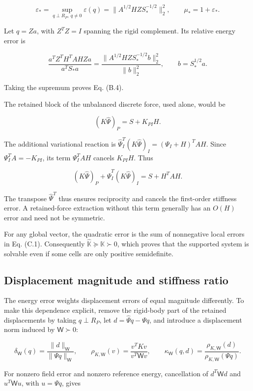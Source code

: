 \documentclass[preprint,12pt,authoryear]{elsarticle}
\begin{document}
\[
\varepsilon_*=\sup_{q\perp R_P,\ q\ne0}\varepsilon(q)
=\|A^{1/2}HZ S_*^{-1/2}\|_2^2,
\qquad\mu_*=1+\varepsilon_*.
\tag{B.4}
\]

Let \(q=Za\), with \(Z^TZ=I\) spanning the rigid complement. Its relative energy error is

\[
\frac{a^TZ^TH^TAHZa}{a^TS_*a}
=\frac{\|A^{1/2}HZ S_*^{-1/2}b\|_2^2}{\|b\|_2^2},
\qquad b=S_*^{1/2}a.
\tag{B.5}
\]

Taking the supremum proves Eq. (B.4).

The retained block of the unbalanced discrete force, used alone, would be

\[
(K\widehat\Psi)_P=S+K_{PI}H.
\]

The additional variational reaction is \(\widehat\Psi_I^T(K\widehat\Psi)_I=(\Psi_I+H)^TAH\). Since \(\Psi_I^TA=-K_{PI}\), its term \(\Psi_I^TAH\) cancels \(K_{PI}H\). Thus

\[
(K\widehat\Psi)_P+\widehat\Psi_I^T(K\widehat\Psi)_I=S+H^TAH.
\tag{B.6}
\]

The transpose \(\widehat\Psi^T\) thus ensures reciprocity and cancels the first-order stiffness error. A retained-force extraction without this term generally has an \(O(H)\) error and need not be symmetric.

For any global vector, the quadratic error is the sum of nonnegative local errors in Eq. (C.1). Consequently \(\widehat{\mathbb K}\succeq\mathbb K\succ0\), which proves that the supported system is solvable even if some cells are only positive semidefinite.

\subsection{Displacement magnitude and stiffness ratio}

The energy error weights displacement errors of equal magnitude differently. To make this dependence explicit, remove the rigid-body part of the retained displacements by taking \(q\perp R_P\), let \(d=\widehat\Psi q-\Psi q\), and introduce a displacement norm induced by \(\mathsf W\succ0\):

\[
\delta_{\mathsf W}(q)=\frac{\|d\|_{\mathsf W}}{\|\Psi q\|_{\mathsf W}},\qquad
\rho_{K,\mathsf W}(v)=\frac{v^TKv}{v^T\mathsf Wv},\qquad
\kappa_{\mathsf W}(q,d)=\frac{\rho_{K,\mathsf W}(d)}{\rho_{K,\mathsf W}(\Psi q)}.
\tag{B.7}
\]

For nonzero field error and nonzero reference energy, cancellation of \(d^T\mathsf Wd\) and \(u^T\mathsf Wu\), with \(u=\Psi q\), gives
\end{document}
